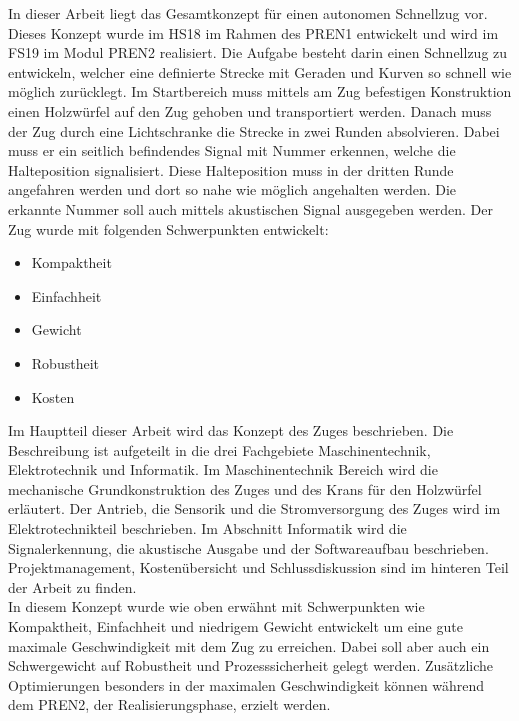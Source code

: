 \documentclass[../../main.tex]{subfiles}
\begin{document}
In dieser Arbeit liegt das Gesamtkonzept für einen autonomen Schnellzug vor. Dieses Konzept wurde im HS18 im Rahmen des PREN1 entwickelt und wird im FS19 im Modul PREN2 realisiert. Die Aufgabe besteht darin einen Schnellzug zu entwickeln, welcher eine definierte Strecke mit Geraden und Kurven so schnell wie möglich zurücklegt. Im Startbereich muss mittels am Zug befestigen Konstruktion einen Holzwürfel auf den Zug gehoben und transportiert werden. Danach muss der Zug durch eine Lichtschranke die Strecke in zwei Runden absolvieren. Dabei muss er ein seitlich befindendes Signal mit Nummer erkennen, welche die Halteposition signalisiert. Diese Halteposition muss in der dritten Runde angefahren werden und dort so nahe wie möglich angehalten werden. Die erkannte Nummer soll auch mittels akustischen Signal ausgegeben werden. Der Zug wurde mit folgenden Schwerpunkten entwickelt:
\begin{itemize}
    \item Kompaktheit
    \item Einfachheit
    \item Gewicht
    \item Robustheit
    \item Kosten
\end{itemize}
Im Hauptteil dieser Arbeit wird das Konzept des Zuges beschrieben. Die Beschreibung ist aufgeteilt in die drei
Fachgebiete Maschinentechnik, Elektrotechnik und Informatik. Im Maschinentechnik Bereich wird die mechanische
Grundkonstruktion des Zuges und des Krans für den Holzwürfel erläutert. Der Antrieb, die Sensorik und die
Stromversorgung des Zuges wird im Elektrotechnikteil beschrieben. Im Abschnitt Informatik wird die Signalerkennung, die
akustische Ausgabe und der Softwareaufbau beschrieben. Projektmanagement, Kostenübersicht und Schlussdiskussion sind im hinteren Teil der Arbeit zu finden.\\
In diesem Konzept wurde wie oben erwähnt mit Schwerpunkten wie Kompaktheit, Einfachheit und niedrigem Gewicht entwickelt um eine gute maximale Geschwindigkeit mit dem Zug zu erreichen. Dabei soll aber auch ein Schwergewicht auf Robustheit und Prozesssicherheit gelegt werden. Zusätzliche Optimierungen besonders in der maximalen Geschwindigkeit können während dem PREN2, der Realisierungsphase, erzielt werden.
\pagebreak
\end{document}
